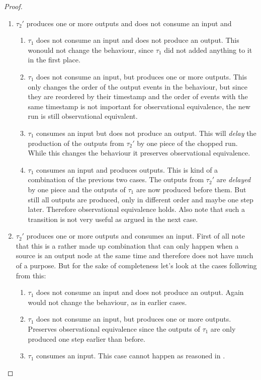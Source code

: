 \begin{proof}
\begin{enumerate}
    \item \(\tau_2'\) produces one or more outputs and does not consume an input and
      \begin{enumerate}
        \item \(\tau_1\) does not consume an input and does not produce an output. This wonould not change the behaviour, since \(\tau_1\) did not added anything to it in the first place.
        \item \(\tau_1\) does not consume an input, but produces one or more outputs. This only changes the order of the output events in the behaviour, but since they are reordered by their timestamp and the order of events with the same timestamp is not important for observational equivalence, the new run is still observational equivalent.
        \item \(\tau_1\) consumes an input but does not produce an output. This will \emph{delay} the production of the outputs from \(\tau_2'\) by one piece of the chopped run. While this changes the behaviour it preserves observational equivalence.
        \item \(\tau_1\) consumes an input and produces outputs. This is kind of a combination of the previous two cases. The outputs from \(\tau_2'\) are \emph{delayed} by one piece and the outputs of \(\tau_1\) are now produced before them. But still all outputs are produced, only in different order and maybe one step later. Therefore observational equivalence holds. Also note that such a transition is not very useful as argued in the next case.
      \end{enumerate}
    \item \(\tau_2'\) produces one or more outputs and consumes an input. First of all note that this is a rather made up combination that can only happen when a source is an output node at the same time and therefore does not have much of a purpose. But for the sake of completeness let's look at the cases following from this:
      \begin{enumerate}
        \item \(\tau_1\) does not consume an input and does not produce an output. Again would not change the behaviour, as in earlier cases.
        \item\label{sec:behaviours:without_timing:greedy:non_greedy_2} \(\tau_1\) does not consume an input, but produces one or more outputs. Preserves observational equivalence since the outputs of \(\tau_1\) are only produced one step earlier than before.
        \item \(\tau_1\) consumes an input. This case cannot happen as reasoned in .
      \end{enumerate}
  \end{enumerate}


\end{proof}
